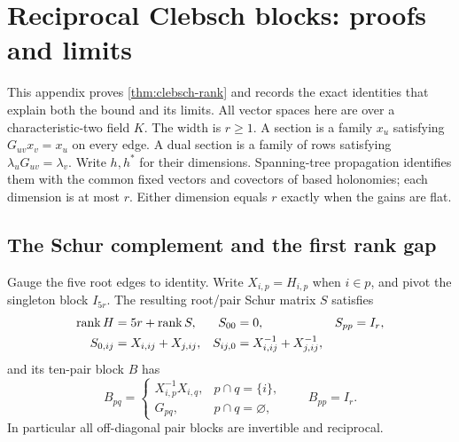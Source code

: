 \section{Reciprocal Clebsch blocks: proofs and limits}
\label{sec:clebsch-block-proof}

This appendix proves \cref{thm:clebsch-rank} and records the exact
identities that explain both the bound and its limits. All vector
spaces here are over a characteristic-two field $K$. The width is
$r\ge1$. A section is a family $x_u$ satisfying $G_{uv}x_v=x_u$ on
every edge. A dual section is a family of rows satisfying
$\lambda_uG_{uv}=\lambda_v$. Write $h,h^*$ for their dimensions.
Spanning-tree propagation identifies them with the common fixed
vectors and covectors of based holonomies; each dimension is at most
$r$. Either dimension equals $r$ exactly when the gains are flat.

\subsection{The Schur complement and the first rank gap}
Gauge the five root edges to identity. Write $X_{i,p}=H_{i,p}$ when
$i\in p$, and pivot the singleton block $I_{5r}$. The resulting
root/pair Schur matrix $S$ satisfies
\begin{align*}
 \operatorname{rank} H&=5r+\operatorname{rank} S,& S_{00}&=0,&S_{pp}&=I_r,\\
 S_{0,ij}&=X_{i,ij}+X_{j,ij},&
 S_{ij,0}&=X_{i,ij}^{-1}+X_{j,ij}^{-1},
\end{align*}
and its ten-pair block $B$ has
\[
 B_{pq}=\begin{cases}
 X_{i,p}^{-1}X_{i,q},&p\cap q=\{i\},\\
 G_{pq},&p\cap q=\varnothing,
 \end{cases}\qquad B_{pp}=I_r.
\]
In particular all off-diagonal pair blocks are invertible and reciprocal.

